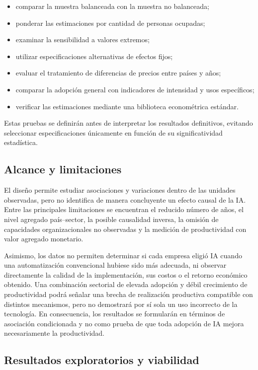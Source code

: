\documentclass[12pt,a4paper]{article}
\begin{document}
\begin{itemize}
  \item comparar la muestra balanceada con la muestra no balanceada;
  \item ponderar las estimaciones por cantidad de personas ocupadas;
  \item examinar la sensibilidad a valores extremos;
  \item utilizar especificaciones alternativas de efectos fijos;
  \item evaluar el tratamiento de diferencias de precios entre países y años;
  \item comparar la adopción general con indicadores de intensidad y usos específicos;
  \item verificar las estimaciones mediante una biblioteca econométrica estándar.
\end{itemize}

Estas pruebas se definirán antes de interpretar los resultados definitivos, evitando seleccionar especificaciones únicamente en función de su significatividad estadística.

\subsection{Alcance y limitaciones}

El diseño permite estudiar asociaciones y variaciones dentro de las unidades observadas, pero no identifica de manera concluyente un efecto causal de la IA. Entre las principales limitaciones se encuentran el reducido número de años, el nivel agregado país--sector, la posible causalidad inversa, la omisión de capacidades organizacionales no observadas y la medición de productividad con valor agregado monetario.

Asimismo, los datos no permiten determinar si cada empresa eligió IA cuando una automatización convencional hubiese sido más adecuada, ni observar directamente la calidad de la implementación, sus costos o el retorno económico obtenido. Una combinación sectorial de elevada adopción y débil crecimiento de productividad podrá señalar una brecha de realización productiva compatible con distintos mecanismos, pero no demostrará por sí sola un uso incorrecto de la tecnología. En consecuencia, los resultados se formularán en términos de asociación condicionada y no como prueba de que toda adopción de IA mejora necesariamente la productividad.

\subsection{Resultados exploratorios y viabilidad}
\end{document}
